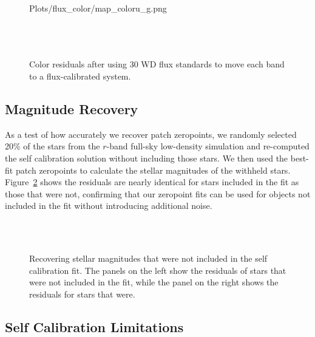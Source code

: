 \documentclass[12pt,preprint]{aastex}
\begin{document}
\begin{figure}
 {Plots/flux_color/map_coloru_g.png} \\
 \\
 \\
 \\
\caption{Color residuals after using 30 WD flux standards to move each band to a flux-calibrated system.   \label{fig:colorcolor}}
\end{figure}

\subsection{Magnitude Recovery}

As a test of how accurately we recover patch zeropoints, we randomly selected 20\% of the stars from the $r$-band full-sky low-density simulation and re-computed the self calibration solution without including those stars.  We then used the best-fit patch zeropoints to calculate the stellar magnitudes of the withheld stars.  Figure~\ref{fig:zpcheck} shows the residuals are nearly identical for stars included in the fit as those that were not, confirming that our zeropoint fits can be used for objects not included in the fit without introducing additional noise.


\begin{figure}
 \\
 \\
\caption{Recovering stellar magnitudes that were not included in the self calibration fit.  The panels on the left show the residuals of stars that were not included in the fit, while the panel on the right shows the residuals for stars that were.  \label{fig:zpcheck}}
\end{figure}



\subsection{Self Calibration Limitations}
\end{document}
